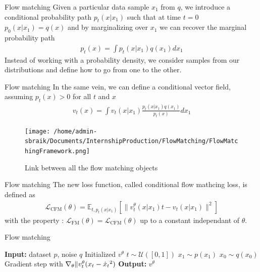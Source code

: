 \documentclass{beamer}
\begin{document}
\begin{frame}{Flow matching}
    Given a particular data sample \(x_1\) from \(q\), we introduce a conditional probability path \(p_t(x|x_1)\) such that at time \(t=0\) \(p_0(x|x_1)=q(x)\) and by marginalizing over \(x_1\) we can recover the marginal probability path 
    \begin{align}
        p_t(x)=\int p_t(x|x_1)q(x_1)dx_1
    \end{align}
    Instead of working with a probability density, we consider samples from our distributions and define how to go from one to the other.\\
\end{frame}
    
\begin{frame}{Flow matching}
    In the same vein, we can define a conditional vector field, assuming \(p_t(x)>0\) for all \(t\) and \(x\)
    \begin{align}
        v_t(x)=\int v_t(x|x_1)\frac{p_t(x|x_1)q(x_1)}{p_t(x)}dx_1
    \end{align}
\end{frame}

\begin{frame}
\begin{figure}
    \centering
    \texttt{[image: /home/admin-sbraik/Documents/InternshipProduction/FlowMatching/FlowMatchingFramework.png]}
    \caption{Link between all the flow matching objects}
    \label{fig:flow_matching_full}
\end{figure}
\end{frame}

\begin{frame}{Flow matching}
    The new loss function, called conditional flow mathcing loss, is defined as
    \begin{align}
        \mathcal{L}_\text{CFM}(\theta)=\mathbb{E}_{t,p_t(x|x_1)}\left[ \| v_t^\theta(x|x_1)t-v_t(x|x_1)\|^2 \right]
    \end{align}
    with the property : \( \mathcal{L}_\text{FM}(\theta)=\mathcal{L}_\text{CFM}(\theta) \) up to a constant independant of \(\theta\).
\end{frame}


\begin{frame}{Flow matching}
    \begin{algorithm}[H]
        \caption{Flow matching training}\label{alg:flow_matching_training}
            \begin{algorithmic}
                \State \textbf{Input:} dataset \(p\), noise \(q\)
                \State Initialized \(v^\theta\)
                    \State \(t\sim\mathcal{U}([0,1])\)
                    \State \(x_1\sim p(x_1)\)
                    \State \(x_0\sim q(x_0)\)
                    \State Gradient step with \(\nabla_\theta \| v_t^\theta (x_t -\dot{x}_t \-^2)\)
                \EndWhile
                \State \textbf{Output:} \(v^\theta\)
            \end{algorithmic}
        \end{algorithm}
\end{frame}
\end{document}
